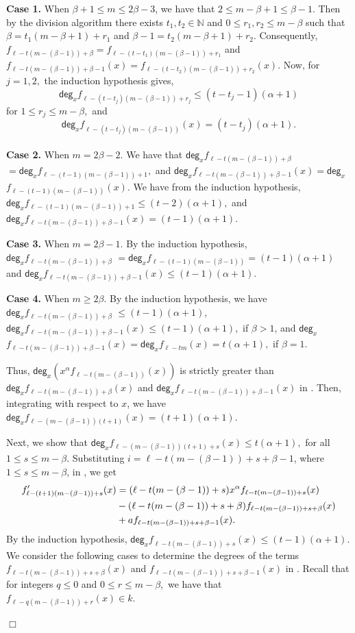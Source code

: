\documentclass[12pt,reqno]{amsart}
\renewcommand{\deg}{\mathsf{deg}}
\renewcommand{\leq}{\leqslant}
\renewcommand{\geq}{\geqslant}
\numberwithin{thm}{section}
\theoremstyle{definition}
\numberwithin{equation}{thm}
\renewenvironment{proof}{\par\noindent {\em Proof:}}{\hfill$\Box$\medskip}
\theoremstyle{plain}
\begin{document}
\begin{proof}
\medskip
\noindent\textbf{Case 1.} When $\beta+1\leq m \leq 2\beta-3$, we have that $2\leq m-\beta+1\leq \beta-1.$ Then by the division algorithm there exists $t_1,t_2\in \mathbb{N}$ and $0 \leq r_1,r_2\leq m-\beta$ such that  $\beta=t_1(m-\beta+1)+r_1$ and $\beta-1=t_2(m-\beta+1)+r_2.$ Consequently, $f_{\ell-t(m-(\beta-1))+\beta}=f_{\ell-(t-t_1)(m-(\beta-1))+r_1}$ and $f_{\ell-t(m-(\beta-1))+\beta-1}(x)=f_{\ell-(t-t_2)(m-(\beta-1))+r_2}(x).$   Now, for $j=1,2,$ the induction hypothesis gives, $$\deg_x f_{\ell-(t-t_j)(m-(\beta-1))+r_j} \leq (t-t_j-1)(\alpha+1)$$ for $1\leq r_j\leq m-\beta,$ and $$\deg_x f_{\ell-(t-t_j)(m-(\beta-1))}(x)=(t-t_j)(\alpha+1).$$\\
\textbf{Case 2.} When $m=2 \beta -2$. We have that $\deg_x f_{\ell-t(m-(\beta-1))+\beta}$ $=\deg_x f_{\ell-(t-1)(m-(\beta-1))+1},$ and $\deg_xf_{\ell-t(m-(\beta-1))+\beta-1}(x)=\deg_x$ $f_{\ell-(t-1)(m-(\beta-1))}(x).$ We have from the induction hypothesis, $\deg_x f_{\ell-(t-1)(m-(\beta-1))+1}\leq (t-2)(\alpha+1),$ and $\deg_xf_{\ell-t(m-(\beta-1))+\beta-1}(x)=(t-1)(\alpha+1).$ 

\medskip
\noindent
\textbf{Case 3.} When $m=2\beta -1$. By the induction hypothesis, $\deg_x f_{\ell-t(m-(\beta-1))+\beta}$ $=\deg_x f_{\ell-(t-1)(m-(\beta-1))}= (t-1)(\alpha+1)$ and $\deg_xf_{\ell-t(m-(\beta-1))+\beta-1}(x)\leq (t-1)(\alpha+1).$

\medskip
\noindent
\textbf{Case 4.} When $m \geq 2\beta$. By the induction hypothesis, we have $\deg_x f_{\ell-t(m-(\beta-1))+\beta}$ $\leq (t-1)(\alpha+1)$, $\deg_xf_{\ell-t(m-(\beta-1))+\beta-1}(x)\leq (t-1)(\alpha+1),$ if $\beta>1$, and $\deg_x$ $f_{\ell-t(m-(\beta-1))+\beta-1}(x)=\deg_xf_{\ell-tm}(x)=t(\alpha+1),$ if $\beta=1.$

\medskip
\noindent Thus,  $\deg_x(x^\alpha f_{\ell-t(m-(\beta-1))}(x))$ is strictly greater than $\deg_xf_{\ell-t(m-(\beta-1))+\beta}(x)$ and $\deg_xf_{\ell-t(m-(\beta-1))+\beta-1}(x)$ in . Then, integrating  with respect to $x$, we have $\deg_x f_{\ell-(m-(\beta-1))(t+1)}(x)=(t+1)(\alpha+1)$.

\medskip
\noindent Next, we show that $\deg_x f_{\ell-(m-(\beta-1))(t+1)+s}(x)\leq t(\alpha+1),$ for all $1\leq s\leq m-\beta.$ 
Substituting $i=\ell-t(m-(\beta-1))+s+\beta-1$, where $1\leq s\leq m-\beta$, in , we get
\begin{align}\label{eq1:8}
f'_{\ell-(t+1)(m-(\beta-1))+s}(x)&=(\ell-t(m-(\beta-1))+s)x^\alpha f_{\ell-t(m-(\beta-1))+s}(x)\notag \\
&-(\ell-t(m-(\beta-1))+s+\beta)f_{\ell-t(m-(\beta-1))+s+\beta}(x) \notag \\
&+af_{\ell-t(m-(\beta-1))+s+\beta-1}(x).
\end{align}
\noindent
By the induction hypothesis, $\deg_x f_{\ell-t(m-(\beta-1))+s}(x)\leq(t-1)(\alpha+1)$. We consider the following cases to determine the degrees of the terms $f_{\ell-t(m-(\beta-1))+s+\beta}(x)$ and $f_{\ell-t(m-(\beta-1))+s+\beta-1}(x)$ in . Recall that  for integers $q\leq 0$ and $0\leq r\leq m-\beta,$ we have that $f_{\ell-q(m-(\beta-1))+r}(x)\in k.$


\end{proof}
\end{document}
